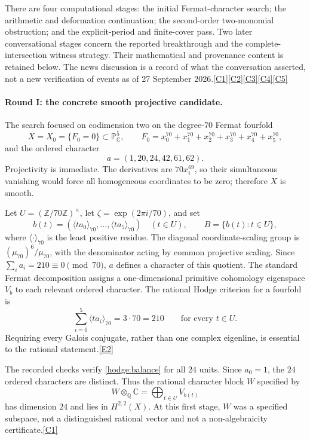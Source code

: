 \documentclass[11pt]{article}
\newcommand{\Q}{\mathbb Q}
\newcommand{\Z}{\mathbb Z}
\newcommand{\C}{\mathbb C}
\newcommand{\src}[1]{\hyperlink{src:#1}{[#1]}}
\begin{document}
There are four computational stages: the initial Fermat-character search;
the arithmetic and deformation continuation; the second-order two-monomial
obstruction; and the explicit-period and finite-cover pass. Two later
conversational stages concern the reported breakthrough and the
complete-intersection witness strategy. Their mathematical and provenance
content is retained below. The news discussion is a record of what the
conversation asserted, not a new verification of events as of 27 September
2026.\src{C1}\src{C2}\src{C3}\src{C4}\src{C5}

\paragraph{Round I: the concrete smooth projective candidate.}
The search focused on codimension two on the degree-$70$ Fermat fourfold
\begin{equation}\label{hodge:fermat}
 X=X_0=\{F_0=0\}\subset\mathbb P^5_{\C},\qquad
 F_0=x_0^{70}+x_1^{70}+x_2^{70}+x_3^{70}+x_4^{70}+x_5^{70},
\end{equation}
and the ordered character
\begin{equation}\label{hodge:character}
 a=(1,20,24,42,61,62).
\end{equation}
Projectivity is immediate. The derivatives are $70x_i^{69}$, so their
simultaneous vanishing would force all homogeneous coordinates to be zero;
therefore $X$ is smooth.

Let $U=(\Z/70\Z)^\times$, let $\zeta=\exp(2\pi i/70)$, and set
\[
 b(t)=(\langle ta_0\rangle_{70},\ldots,
       \langle ta_5\rangle_{70})\quad(t\in U),
 \qquad B=\{b(t):t\in U\},
\]
where $\langle\cdot\rangle_{70}$ is the least positive residue. The diagonal
coordinate-scaling group is $(\mu_{70})^6/\mu_{70}$, with the denominator
acting by common projective scaling. Since $\sum_i a_i=210\equiv0\pmod{70}$,
$a$ defines a character of this quotient. The standard Fermat decomposition
assigns a one-dimensional primitive cohomology eigenspace $V_b$ to each
relevant ordered character. The rational Hodge criterion for a fourfold is
\begin{equation}\label{hodge:balance}
 \sum_{i=0}^{5}\langle ta_i\rangle_{70}=3\cdot70=210
 \qquad\text{for every }t\in U.
\end{equation}
Requiring every Galois conjugate, rather than one complex eigenline, is
essential to the rational statement.\src{E2}

The recorded checks verify \eqref{hodge:balance} for all $24$ units. Since
$a_0=1$, the $24$ ordered characters are distinct. Thus the rational
character block $W$ specified by
\begin{equation}\label{hodge:block}
 W\otimes_{\Q}\C=\bigoplus_{t\in U}V_{b(t)}
\end{equation}
has dimension $24$ and lies in $H^{2,2}(X)$. At this first stage, $W$ was a
specified subspace, not a distinguished rational vector and not a
non-algebraicity certificate.\src{C1}
\end{document}
